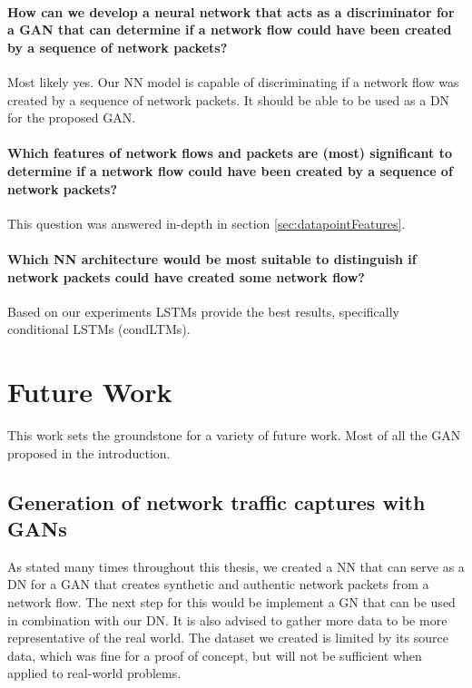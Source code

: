 \documentclass[
	ngerman,
	ruledheaders=section,%
	class=report,%
	thesis={type=bachelor},%
	accentcolor=9c,%
	custommargins=true,%
	marginpar=false,%
	parskip=half-,%
	fontsize=11pt,%
]{tudapub}
\begin{document}
\paragraph{How can we develop a neural network that acts as a discriminator for a GAN that can determine if a network flow could have been created by a sequence of network packets?}
Most likely yes.
Our NN model is capable of discriminating if a network flow was created by a sequence of network packets.
It should be able to be used as a DN for the proposed GAN.

\paragraph{Which features of network flows and packets are (most) significant to determine if a network flow could have been created by a sequence of network packets?}
This question was answered in-depth in section \ref{sec:datapointFeatures}.

\paragraph{Which NN architecture would be most suitable to distinguish if network packets could have created some network flow?}
Based on our experiments LSTMs provide the best results, specifically conditional LSTMs (condLTMs).

\section{Future Work}
\label{sec:futureWork}

This work sets the groundstone for a variety of future work.
Most of all the GAN proposed in the introduction.

\subsection{Generation of network traffic captures with GANs}
\label{sec:futureGAN}

As stated many times throughout this thesis, we created a NN that can serve as a DN for a GAN that creates synthetic and authentic network packets from a network flow.
The next step for this would be implement a GN that can be used in combination with our DN.
It is also advised to gather more data to be more representative of the real world.
The dataset we created is limited by its source data, which was fine for a proof of concept, but will not be sufficient when applied to real-world problems.
\end{document}
